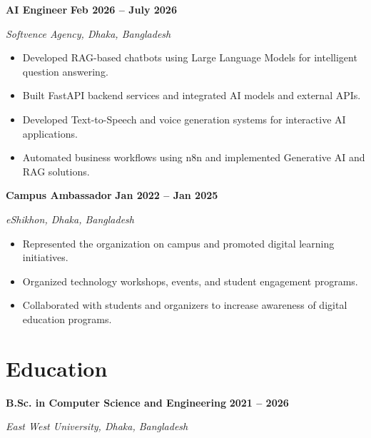 ﻿\documentclass[10pt,a4paper]{article}
\begin{document}
\vspace{2mm}

\textbf{AI Engineer}
\hfill
\textbf{Feb 2026 -- July 2026}

\textit{Softvence Agency, Dhaka, Bangladesh}

\begin{itemize}

\item Developed RAG-based chatbots using Large Language Models for intelligent question answering.

\item Built FastAPI backend services and integrated AI models and external APIs.

\item Developed Text-to-Speech and voice generation systems for interactive AI applications.

\item Automated business workflows using n8n and implemented Generative AI and RAG solutions.

\end{itemize}

\textbf{Campus Ambassador}
\hfill
\textbf{Jan 2022 -- Jan 2025}

\textit{eShikhon, Dhaka, Bangladesh}

\begin{itemize}

\item Represented the organization on campus and promoted digital learning initiatives.

\item Organized technology workshops, events, and student engagement programs.

\item Collaborated with students and organizers to increase awareness of digital education programs.

\end{itemize}


\section{Education}

\textbf{B.Sc. in Computer Science and Engineering}
\hfill
\textbf{2021 -- 2026}

\textit{East West University, Dhaka, Bangladesh}
\end{document}
